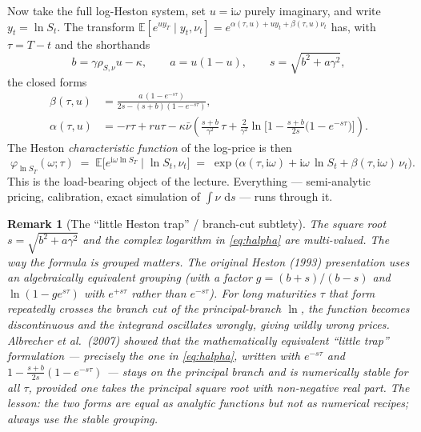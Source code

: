 \documentclass[11pt]{article}
\newcommand{\E}{\mathbb{E}}
\newcommand{\ii}{\mathrm{i}}
\newcommand{\dd}{\,\mathrm{d}}
\newcommand{\ch}{\varphi}
\newtheorem{remark}{Remark}
\begin{document}
Now take the full log-Heston system, set $u=\ii\omega$ purely imaginary, and write
$y_t=\ln S_t$. The transform
$\E[e^{u y_T}\mid y_t,\nu_t]=e^{\alpha(\tau,u)+u y_t+\beta(\tau,u)\nu_t}$ has, with
$\tau=T-t$ and the shorthands
\begin{equation}
b = \gamma\rho_{S,\nu}u-\kappa,
\qquad a = u(1-u),
\qquad s = \sqrt{b^2 + a\gamma^2},
\end{equation}
the closed forms
\begin{align}
\beta(\tau,u) &= \frac{a\,(1-e^{-s\tau})}{2s-(s+b)(1-e^{-s\tau})}, \label{eq:hbeta}\\
\alpha(\tau,u) &= -r\tau + ru\tau
- \kappa\bar\nu\left(\frac{s+b}{\gamma^2}\,\tau
+ \frac{2}{\gamma^2}\ln\!\Big[1-\frac{s+b}{2s}\big(1-e^{-s\tau}\big)\Big]\right).
\label{eq:halpha}
\end{align}
The Heston \emph{characteristic function} of the log-price is then
\begin{equation}
\boxed{\;
\ch_{\ln S_T}(\omega; \tau) \;=\; \E\!\big[e^{\ii\omega\ln S_T}\mid \ln S_t,\nu_t\big]
\;=\; \exp\!\big(\alpha(\tau,\ii\omega) + \ii\omega\,\ln S_t + \beta(\tau,\ii\omega)\,\nu_t\big).
\;}
\label{eq:hestoncf}
\end{equation}
This is the load-bearing object of the lecture. Everything --- semi-analytic pricing,
calibration, exact simulation of $\int\nu\,\dd s$ --- runs through it.

\begin{remark}[The ``little Heston trap'' / branch-cut subtlety]
The square root $s=\sqrt{b^2+a\gamma^2}$ and the complex logarithm in
\eqref{eq:halpha} are multi-valued. The way the formula is grouped
matters. The original Heston (1993) presentation uses an algebraically equivalent
grouping (with a factor $g=(b+s)/(b-s)$ and $\ln(1-g e^{s\tau})$ with $e^{+s\tau}$ rather
than $e^{-s\tau}$). For long maturities $\tau$ that form repeatedly crosses the branch cut
of the principal-branch $\ln$, the function becomes discontinuous and the integrand
oscillates wrongly, giving \emph{wildly wrong prices}. Albrecher et al.\ (2007) showed
that the mathematically equivalent ``little trap'' formulation --- precisely the one in
\eqref{eq:halpha}, written with $e^{-s\tau}$ and $1-\tfrac{s+b}{2s}(1-e^{-s\tau})$ ---
stays on the principal branch and is numerically stable for all $\tau$, provided one takes
the principal square root with non-negative real part. The lesson: the two forms are equal
as analytic functions but not as numerical recipes; always use the stable grouping.
\end{remark}
\end{document}
